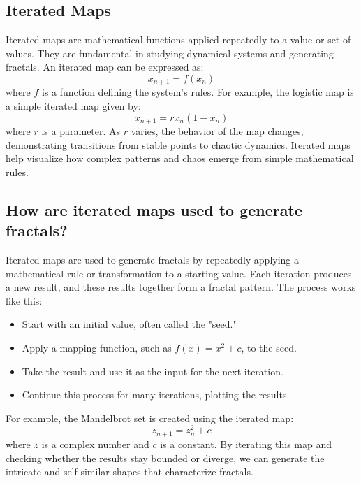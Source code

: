 \documentclass[12pt]{article}
\begin{document}
\subsection{Iterated Maps}
Iterated maps are mathematical functions applied repeatedly to a value or set of values. They are fundamental in studying dynamical systems and generating fractals. An iterated map can be expressed as:
\[
x_{n+1} = f(x_n)
\]
where \( f \) is a function defining the system's rules. For example, the logistic map is a simple iterated map given by:
\[
x_{n+1} = r x_n (1 - x_n)
\]
where \( r \) is a parameter. As \( r \) varies, the behavior of the map changes, demonstrating transitions from stable points to chaotic dynamics. Iterated maps help visualize how complex patterns and chaos emerge from simple mathematical rules.


\subsection{How are iterated maps used to generate fractals?}
Iterated maps are used to generate fractals by repeatedly applying a mathematical rule or transformation to a starting value. Each iteration produces a new result, and these results together form a fractal pattern. The process works like this:
\begin{itemize}
    \item Start with an initial value, often called the "seed."
    \item Apply a mapping function, such as \( f(x) = x^2 + c \), to the seed.
    \item Take the result and use it as the input for the next iteration.
    \item Continue this process for many iterations, plotting the results.
\end{itemize}

For example, the Mandelbrot set is created using the iterated map:
\[
z_{n+1} = z_n^2 + c
\]
where \( z \) is a complex number and \( c \) is a constant. By iterating this map and checking whether the results stay bounded or diverge, we can generate the intricate and self-similar shapes that characterize fractals.
\end{document}

